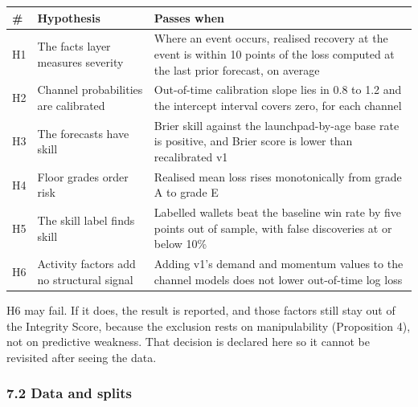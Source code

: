 {\def\LTcaptype{none} %
\begin{longtable}[]{@{}
  >{\raggedright\arraybackslash}p{}
  >{\raggedright\arraybackslash}p{}
  >{\raggedright\arraybackslash}p{}@{}}
\toprule\noalign{}
\begin{minipage}[b]{\linewidth}\raggedright
\#
\end{minipage} & \begin{minipage}[b]{\linewidth}\raggedright
Hypothesis
\end{minipage} & \begin{minipage}[b]{\linewidth}\raggedright
Passes when
\end{minipage} \\
\midrule\noalign{}
\endhead
\bottomrule\noalign{}
\endlastfoot
H1 & The facts layer measures severity & Where an event occurs, realised recovery at the event is within 10 points of the loss computed at the last prior forecast, on average \\
H2 & Channel probabilities are calibrated & Out-of-time calibration slope lies in 0.8 to 1.2 and the intercept interval covers zero, for each channel \\
H3 & The forecasts have skill & Brier skill against the launchpad-by-age base rate is positive, and Brier score is lower than recalibrated v1 \\
H4 & Floor grades order risk & Realised mean loss rises monotonically from grade A to grade E \\
H5 & The skill label finds skill & Labelled wallets beat the baseline win rate by five points out of sample, with false discoveries at or below 10\% \\
H6 & Activity factors add no structural signal & Adding v1's demand and momentum values to the channel models does not lower out-of-time log loss \\
\end{longtable}
}

H6 may fail. If it does, the result is reported, and those factors still stay out of the Integrity Score, because the exclusion rests on manipulability (Proposition 4), not on predictive weakness. That decision is declared here so it cannot be revisited after seeing the data.

\subsubsection{7.2 Data and splits}\label{data-and-splits}

